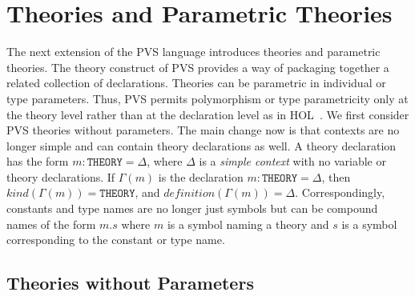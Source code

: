 \documentclass [12pt,twoside]{cslreport}
\newcommand{\tttheory}{\mathtt{THEORY}}
\newcommand{\itkind}{\textit{kind}}
\newcommand{\itdef}{\textit{definition}}
\begin{document}
\chapter{Theories and Parametric Theories}\label{theories}

The next extension of the PVS language introduces theories and parametric
theories.  
The theory construct of PVS provides a way of packaging together a related
collection of declarations.  Theories can be parametric in
individual or type parameters.  Thus, PVS permits polymorphism or type
parametricity only at the theory level rather than at the declaration
level as in HOL~\cite{Gordon&Melham:HOL}.  
We first consider PVS theories without parameters.  The main change now is
that contexts are no longer simple and can contain theory declarations as
well.  A theory declaration has the form $m : \tttheory{} = \Delta$,
where $\Delta$ is a \emph{simple context} with no variable or theory
declarations. 
If $\Gamma(m)$ is the declaration $m : \tttheory{} = \Delta$, then
$ \itkind{}(\Gamma(m)) = \tttheory{}$, and
$ \itdef{}(\Gamma(m)) = \Delta$\@.
Correspondingly, constants and type names are no longer just symbols
but can be compound names of the form $m.s$ where $m$ is a symbol
naming a theory and $s$ is a symbol corresponding to the constant or type
name.

\section{Theories without Parameters}
\end{document}
